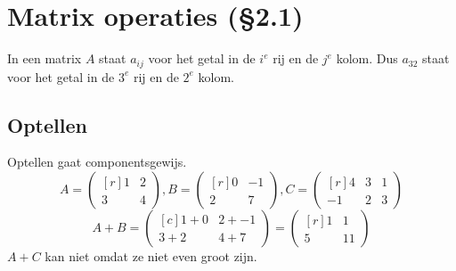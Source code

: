 \section{Matrix operaties (\S2.1)}
In een matrix $A$ staat $a_{ij}$ voor het getal in de $i^e$ rij en de $j^e$ kolom. Dus $a_{32}$ staat voor het getal in de $3^e$ rij en de $2^e$ kolom.
\subsection{Optellen}
Optellen gaat componentsgewijs.
\[ A = \begin{pmatrix*}[r] 1 & 2 \\ 3 & 4 \end{pmatrix*}, B = \begin{pmatrix*}[r]0 & -1 \\ 2 & 7 \end{pmatrix*}, C = \begin{pmatrix*}[r] 4 & 3 & 1 \\ -1 & 2 & 3 \end{pmatrix*} \]
\[ A+B = \begin{pmatrix*}[c] 1+0 & 2+ -1 \\
3+2 & 4+7 \end{pmatrix*} = \begin{pmatrix*}[r] 1 & 1 \\ 5 & 11 \end{pmatrix*} \]
$A+C$ kan niet omdat ze niet even groot zijn.

